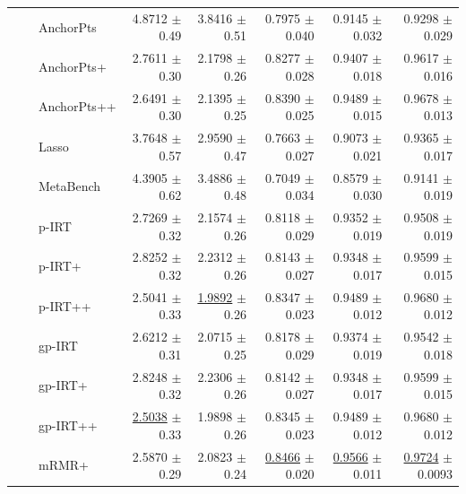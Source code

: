\begin{longtable}{llp{}rrrrr}
 &  & AnchorPts & 4.8712 {\scriptsize $\pm$ 0.49} & 3.8416 {\scriptsize $\pm$ 0.51} & 0.7975 {\scriptsize $\pm$ 0.040} & 0.9145 {\scriptsize $\pm$ 0.032} & 0.9298 {\scriptsize $\pm$ 0.029} \\
 &  & AnchorPts+ & 2.7611 {\scriptsize $\pm$ 0.30} & 2.1798 {\scriptsize $\pm$ 0.26} & 0.8277 {\scriptsize $\pm$ 0.028} & 0.9407 {\scriptsize $\pm$ 0.018} & 0.9617 {\scriptsize $\pm$ 0.016} \\
 &  & AnchorPts++ & 2.6491 {\scriptsize $\pm$ 0.30} & 2.1395 {\scriptsize $\pm$ 0.25} & 0.8390 {\scriptsize $\pm$ 0.025} & 0.9489 {\scriptsize $\pm$ 0.015} & 0.9678 {\scriptsize $\pm$ 0.013} \\
 &  & Lasso & 3.7648 {\scriptsize $\pm$ 0.57} & 2.9590 {\scriptsize $\pm$ 0.47} & 0.7663 {\scriptsize $\pm$ 0.027} & 0.9073 {\scriptsize $\pm$ 0.021} & 0.9365 {\scriptsize $\pm$ 0.017} \\
 &  & MetaBench & 4.3905 {\scriptsize $\pm$ 0.62} & 3.4886 {\scriptsize $\pm$ 0.48} & 0.7049 {\scriptsize $\pm$ 0.034} & 0.8579 {\scriptsize $\pm$ 0.030} & 0.9141 {\scriptsize $\pm$ 0.019} \\
 &  & p-IRT & 2.7269 {\scriptsize $\pm$ 0.32} & 2.1574 {\scriptsize $\pm$ 0.26} & 0.8118 {\scriptsize $\pm$ 0.029} & 0.9352 {\scriptsize $\pm$ 0.019} & 0.9508 {\scriptsize $\pm$ 0.019} \\
 &  & p-IRT+ & 2.8252 {\scriptsize $\pm$ 0.32} & 2.2312 {\scriptsize $\pm$ 0.26} & 0.8143 {\scriptsize $\pm$ 0.027} & 0.9348 {\scriptsize $\pm$ 0.017} & 0.9599 {\scriptsize $\pm$ 0.015} \\
 &  & p-IRT++ & 2.5041 {\scriptsize $\pm$ 0.33} & \underline{1.9892} {\scriptsize $\pm$ 0.26} & 0.8347 {\scriptsize $\pm$ 0.023} & 0.9489 {\scriptsize $\pm$ 0.012} & 0.9680 {\scriptsize $\pm$ 0.012} \\
 &  & gp-IRT & 2.6212 {\scriptsize $\pm$ 0.31} & 2.0715 {\scriptsize $\pm$ 0.25} & 0.8178 {\scriptsize $\pm$ 0.029} & 0.9374 {\scriptsize $\pm$ 0.019} & 0.9542 {\scriptsize $\pm$ 0.018} \\
 &  & gp-IRT+ & 2.8248 {\scriptsize $\pm$ 0.32} & 2.2306 {\scriptsize $\pm$ 0.26} & 0.8142 {\scriptsize $\pm$ 0.027} & 0.9348 {\scriptsize $\pm$ 0.017} & 0.9599 {\scriptsize $\pm$ 0.015} \\
 &  & gp-IRT++ & \underline{2.5038} {\scriptsize $\pm$ 0.33} & 1.9898 {\scriptsize $\pm$ 0.26} & 0.8345 {\scriptsize $\pm$ 0.023} & 0.9489 {\scriptsize $\pm$ 0.012} & 0.9680 {\scriptsize $\pm$ 0.012} \\
 &  & mRMR+ & 2.5870 {\scriptsize $\pm$ 0.29} & 2.0823 {\scriptsize $\pm$ 0.24} & \underline{0.8466} {\scriptsize $\pm$ 0.020} & \underline{0.9566} {\scriptsize $\pm$ 0.011} & \underline{0.9724} {\scriptsize $\pm$ 0.0093} \\

\end{longtable}
